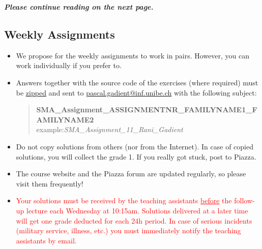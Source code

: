\documentclass [11pt, a4wide, twoside]{article}
\begin{document}
\vspace{4cm}
\begin{center}
\textbf{\textit{\Large{Please continue reading on the next page.}}}
\end{center}

\newpage

\subsection*{Weekly Assignments}
\begin{itemize}
\item We propose for the weekly assignments to work in pairs. However, you can work individually if you prefer to.
\item Answers together with the source code of the exercises (where required) must be \underline{zipped} and sent to \href{mailto:pascal.gadient@inf.unibe.ch}{pascal.gadient@inf.unibe.ch} with the following subject:
\begin{quote}
\textbf{SMA\_Assignment\_ASSIGNMENTNR\_FAMILYNAME1\_FAMILYNAME2}\\example:\hspace{0.5cm}\emph{SMA\_Assignment\_11\_Rani\_Gadient}
\end{quote}
\item Do not copy solutions from others (nor from the Internet). In case of copied solutions, you will collect the grade 1. If you really got stuck, post to Piazza.
\item The course website and the Piazza forum are updated regularly, so please visit them frequently!
\item \textcolor{red}{Your solutions must be received by the teaching assistants \underline{before} the follow-up lecture each Wednesday at 10:15am. Solutions delivered at a later time will get one grade deducted for each 24h period. In case of serious incidents (military service, illness, etc.) you must immediately notify the teaching assistants by email.}
\end{itemize}
\end{document}
